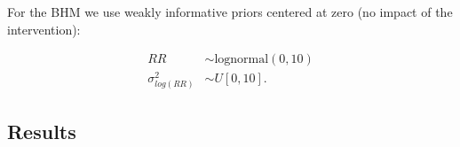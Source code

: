 \documentclass[12pt]{article}
\begin{document}



For the BHM we use weakly informative priors centered at zero (no impact of the intervention):

\begin{equation} \label{lognormal priors}
\begin{aligned}
RR &\sim  \text{lognormal}(0,10) \\
\sigma^2_{log(RR)} &\sim U[0,10].
\end{aligned}
\end{equation}



\subsection{ Results  }
\end{document}

